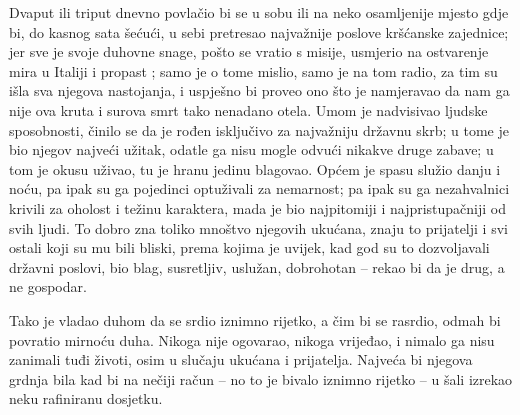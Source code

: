 \documentclass[a5paper,twoside]{article}
\begin{document}
\pend
\pstart
Dvaput ili triput dnevno povlačio bi se u sobu ili na neko osamljenije mjesto gdje bi, do kasnog sata šećući, u sebi pretresao najvažnije poslove kršćanske zajednice; jer sve je svoje duhovne snage, pošto se vratio s misije, usmjerio na ostvarenje mira u Italiji i propast ; samo je o tome mislio, samo je na tom radio, za tim su išla sva njegova nastojanja, i uspješno bi proveo ono što je namjeravao da nam ga nije ova kruta i surova smrt tako nenadano otela.  Umom je nadvisivao ljudske sposobnosti, činilo se da je rođen isključivo za najvažniju državnu skrb; u tome je bio njegov najveći užitak, odatle ga nisu mogle odvući nikakve druge zabave; u tom je okusu uživao, tu je hranu jedinu blagovao.  Općem je spasu služio danju i noću, pa ipak su ga pojedinci optuživali za nemarnost; pa ipak su ga nezahvalnici krivili za oholost i težinu karaktera, mada je bio najpitomiji i najpristupačniji od svih ljudi.  To dobro zna toliko mnoštvo njegovih ukućana, znaju to prijatelji i svi ostali koji su mu bili bliski, prema kojima je uvijek, kad god su to dozvoljavali državni poslovi, bio blag, susretljiv, uslužan, dobrohotan – rekao bi da je drug, a ne gospodar.

\pend
\pstart
Tako je vladao duhom da se srdio iznimno rijetko, a čim bi se rasrdio, odmah bi povratio mirnoću duha.  Nikoga nije ogovarao, nikoga vrijeđao, i nimalo ga nisu zanimali tuđi životi, osim u slučaju ukućana i prijatelja.  Najveća bi njegova grdnja bila kad bi na nečiji račun – no to je bivalo iznimno rijetko – u šali izrekao neku rafiniranu dosjetku.
\end{document}

